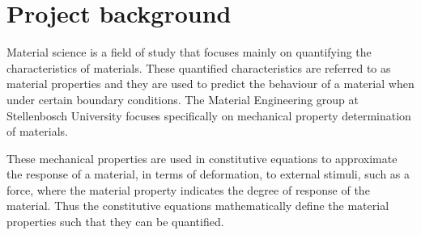 \documentclass[12pt,oneside,openany,a4paper, %
english, %
masters-t, goldenblock]{usthesis}
\begin{document}



\section{Project background}




Material science is a field of study that focuses mainly on quantifying the characteristics of materials. These quantified characteristics are referred to as material properties and they are used to predict the behaviour of a material when under certain boundary conditions. The Material Engineering group at Stellenbosch University focuses specifically on mechanical property determination of materials. 

These mechanical properties are used in constitutive equations to approximate the response of a material, in terms of deformation, to external stimuli, such as a force, where the material property indicates the degree of response of the material. Thus the constitutive equations mathematically define the material properties such that they can be quantified.
\end{document}
